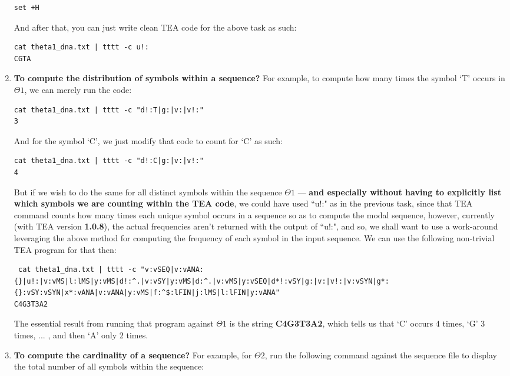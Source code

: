 \documentclass[a4paper, 18pt]{book} %
\begin{document}
\begin{enumerate}
{\begin{verbatim}
set +H
\end{verbatim}

And after that, you can just write clean TEA code for the above task as such:
\begin{verbatim}
cat theta1_dna.txt | tttt -c u!:
CGTA
\end{verbatim}
}
\item {\textbf{To compute the distribution of symbols within a sequence?} For example, to compute how many times the symbol `T' occurs in $\Theta1$, we can merely run the code:

\begin{verbatim}
cat theta1_dna.txt | tttt -c "d!:T|g:|v:|v!:"
3
\end{verbatim}
And for the symbol `C', we just modify that code to count for `C' as such:


\begin{verbatim}
cat theta1_dna.txt | tttt -c "d!:C|g:|v:|v!:"
4
\end{verbatim}

But if we wish to do the same for all distinct symbols within the sequence $\Theta1$ --- \textbf{and especially without having to explicitly list which symbols we are counting within the TEA code}, we could have used ``u!:" as in the previous task, since that TEA command counts how many times each unique symbol occurs in a sequence so as to compute the modal sequence, however, currently (with TEA version \textbf{1.0.8}\cite{cli_tttt}), the actual frequencies aren't returned with the output of ``u!:", and so, we shall want to use a work-around leveraging the above method for computing the frequency of each symbol in the input sequence. We can use the following non-trivial TEA program for that then:

\begin{verbatim}
 cat theta1_dna.txt | tttt -c "v:vSEQ|v:vANA:{}|u!:|v:vMS|l:lMS|y:vMS|d!:^.|v:vSY|y:vMS|d:^.|v:vMS|y:vSEQ|d*!:vSY|g:|v:|v!:|v:vSYN|g*:{}:vSY:vSYN|x*:vANA|v:vANA|y:vMS|f:^$:lFIN|j:lMS|l:lFIN|y:vANA"
C4G3T3A2
\end{verbatim}

The essential result from running that program against $\Theta1$ is the string \textbf{C4G3T3A2}, which tells us that `C' occurs 4 times, `G' 3 times, ... , and then `A' only 2 times. 
}
\item {\textbf{To compute the cardinality of a sequence?} For example, for $\Theta2$, run the following command against the sequence file to display the total number of all symbols within the sequence:

}
\end{enumerate}
\end{document}
